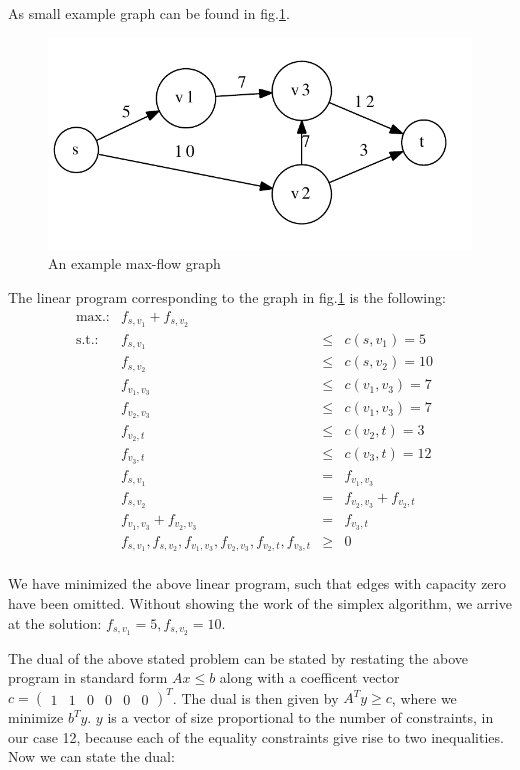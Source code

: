 \documentclass{article}
\begin{document}
As small example graph can be found in fig.\ref{fig:exg}.

\begin{figure}
  \centering
  \includegraphics[width=.7\textwidth]{exg.pdf}
  \caption{An example max-flow graph}
  \label{fig:exg}
\end{figure}

The linear program corresponding to the graph in fig.\ref{fig:exg} is
the following:
\[
\begin{array}{lrcll}
\textrm{max.:} & f_{s,v_1} + f_{s,v_2} & & &\\
\textrm{s.t.:} & f_{s,v_1} &\leq & c(s,v_1) = 5&\\
               & f_{s,v_2} &\leq & c(s,v_2) = 10&\\
               & f_{v_1,v_3} &\leq & c(v_1,v_3) = 7&\\
               & f_{v_2,v_3} &\leq & c(v_1,v_3) = 7&\\
               & f_{v_2,t} &\leq & c(v_2,t) = 3&\\
               & f_{v_3,t} &\leq & c(v_3,t) = 12&\\
               & f_{s,v_1} &= &f_{v_1,v_3}&\\
               & f_{s,v_2} &= &f_{v_2,v_3} + f_{v_2,t}&\\
               & f_{v_1,v_3} + f_{v_2,v_3} &= &f_{v_3,t}&\\
& f_{s,v_1}, f_{s,v_2},f_{v_1,v_3},f_{v_2,v_3},f_{v_2,t}, f_{v_3,t} & \geq & 0\\
\end{array}
\]

We have minimized the above linear program, such that edges with
capacity zero have been omitted. Without showing the work of the
simplex algorithm, we arrive at the solution: $f_{s,v_1} = 5, f_{s,v_2} =
10$.

The dual of the above stated problem can be stated by restating the
above program in standard form $Ax\leq b$ along with a coefficent
vector $c = \begin{pmatrix} 1 & 1 & 0 & 0 & 0 & 0\end{pmatrix}^T$. The
  dual is then given by $A^Ty \geq c$, where we minimize $b^Ty$. $y$
  is a vector of size proportional to the number of constraints, in
  our case 12, because each of the equality constraints give rise to
  two inequalities. Now we can state the dual:
\end{document}
